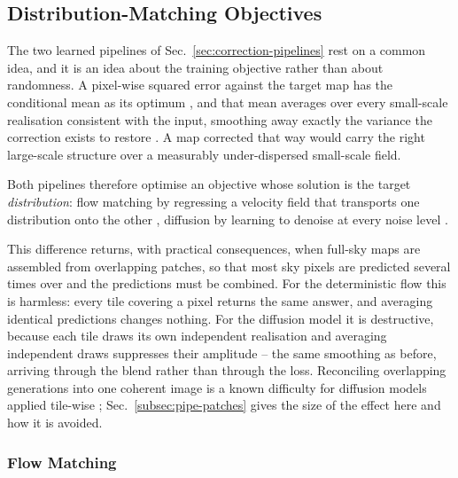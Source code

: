 \documentclass{report}
\begin{document}
\subsection{Distribution-Matching Objectives}
\label{subsec:generative-paradigms}

The two learned pipelines of Sec.~\ref{sec:correction-pipelines} rest on a common idea, and it is an idea about the training objective rather than about randomness. A pixel-wise squared error against the target map has the conditional mean as its optimum \cite{hastie_elements_2009}, and that mean averages over every small-scale realisation consistent with the input, smoothing away exactly the variance the correction exists to restore \cite{ledig_photo-realistic_2017}. A map corrected that way would carry the right large-scale structure over a measurably under-dispersed small-scale field.

Both pipelines therefore optimise an objective whose solution is the target \emph{distribution}: flow matching by regressing a velocity field that transports one distribution onto the other \cite{lipman_flow_2023, liu_flow_2022}, diffusion by learning to denoise at every noise level \cite{ho_denoising_2020, karras_elucidating_2022}.

This difference returns, with practical consequences, when full-sky maps are assembled from overlapping patches, so that most sky pixels are predicted several times over and the predictions must be combined. For the deterministic flow this is harmless: every tile covering a pixel returns the same answer, and averaging identical predictions changes nothing. For the diffusion model it is destructive, because each tile draws its own independent realisation and averaging independent draws suppresses their amplitude \cite{wiegand_kish_1968} -- the same smoothing as before, arriving through the blend rather than through the loss. Reconciling overlapping generations into one coherent image is a known difficulty for diffusion models applied tile-wise \cite{bar-tal_multidiffusion_2023}; Sec.~\ref{subsec:pipe-patches} gives the size of the effect here and how it is avoided.


\subsubsection{Flow Matching}
\label{sssec:flow-matching}
\end{document}
